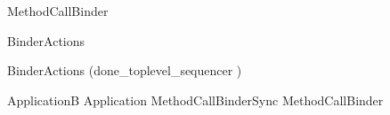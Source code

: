 

\begin{circus}
\circprocess  MethodCallBinder \circdef \circbegin \\
\end{circus}
%
%
\begin{circus}
BinderActions \circdef \\
\circblockopen \circblockclose
\end{circus}
%
\begin{circus}
\circspot BinderActions \circinterrupt (done\_toplevel\_sequencer \then \Skip)
\end{circus}
%
\begin{circus}
\circend
\end{circus}
%
\begin{circus}
\circprocess ApplicationB \circdef Application \lpar MethodCallBinderSync \rpar MethodCallBinder
\end{circus}
